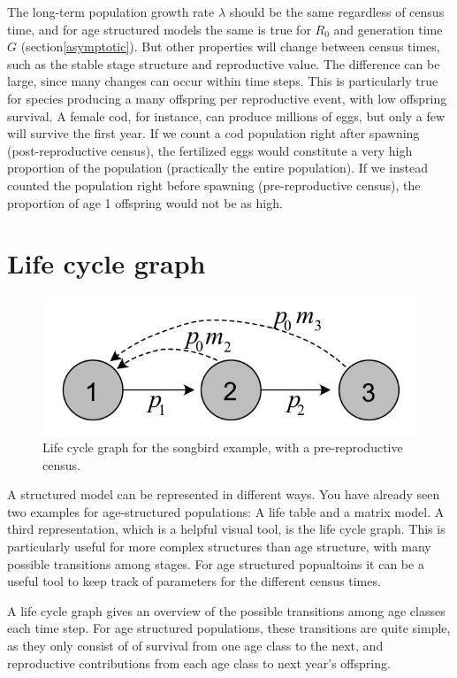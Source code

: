 \documentclass[
]{book}
\begin{document}
The long-term population growth rate \(\lambda\) should be the same regardless of census time, and for age structured models the same is true for \(R_0\) and generation time \(G\) (section\ref{asymptotic}). But other properties will change between census times, such as the stable stage structure and reproductive value. The difference can be large, since many changes can occur within time steps. This is particularly true for species producing a many offspring per reproductive event, with low offspring survival. A female cod, for instance, can produce millions of eggs, but only a few will survive the first year. If we count a cod population right after spawning (post-reproductive census), the fertilized eggs would constitute a very high proportion of the population (practically the entire population). If we instead counted the population right before spawning (pre-reproductive census), the proportion of age 1 offspring would not be as high.

\hypertarget{life-cycle-graph}{%
\section{Life cycle graph}\label{life-cycle-graph}}

\begin{figure}
\includegraphics[width=0.6\linewidth]{LifeCycleAgePRE} \caption{Life cycle graph for the songbird example, with a pre-reproductive census.}\label{fig:Birdfig}
\end{figure}

A structured model can be represented in different ways. You have already seen two examples for age-structured populations: A life table and a matrix model. A third representation, which is a helpful visual tool, is the life cycle graph. This is particularly useful for more complex structures than age structure, with many possible transitions among stages. For age structured popualtoins it can be a useful tool to keep track of parameters for the different census times.

A life cycle graph gives an overview of the possible transitions among age classes each time step. For age structured populations, these transitions are quite simple, as they only consist of of survival from one age class to the next, and reproductive contributions from each age class to next year's offspring.
\end{document}
